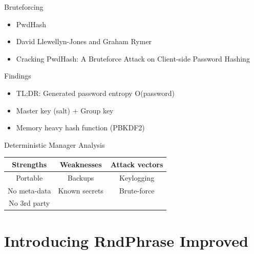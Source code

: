 \documentclass{beamer}
\begin{document}
\begin{frame}{Bruteforcing}
  \begin{itemize}
    \item PwdHash
    \item David Llewellyn-Jones and Graham Rymer
    \item Cracking PwdHash: A Bruteforce Attack on Client-side Password Hashing
  \end{itemize}
\end{frame}

\begin{frame}{Findings}
  \begin{itemize}
    \item TL;DR: Generated password entropy O(password)
    \item Master key (salt) + Group key
    \item Memory heavy hash function (PBKDF2)
  \end{itemize}
\end{frame}

\begin{frame}{Deterministic Manager Analysis}
  \footnotesize
  \begin{table}
    \begin{tabular}{c|c|c}
      \textbf{Strengths} & \textbf{Weaknesses} & \textbf{Attack vectors} \\
      \hline
      Portable & Backups & Keylogging \\
      \hline
      No meta-data & Known secrets & Brute-force \\
      \hline
      No 3rd party & & \\
    \end{tabular}
  \end{table}
\end{frame}

\section{Introducing RndPhrase Improved}
\end{document}

